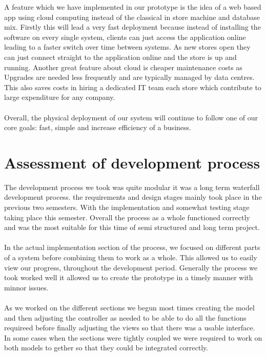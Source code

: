 \documentclass[a4paper]{article}
\begin{document}
A feature which we have implemented in our prototype is the idea of a web based app using cloud computing instead of the classical in store machine and database mix. Firstly this will lead a very fast deployment because instead of installing the software on every single system, clients can just access the application online leading to a faster switch over time between systems. As new stores open they can just connect straight to the application online and the store is up and running. Another great feature about cloud is cheaper maintenance costs as Upgrades are needed less frequently and are typically managed by data centres. This also saves costs in hiring a dedicated IT team each store which contribute to large expenditure for any company. 
\\\\
Overall, the physical deployment of our system will continue to follow one of our core goals: fast, simple and increase efficiency of a business. 
\pagebreak
\section{Assessment of development process}
The development process we took was quite modular it was a long term waterfall development process. the requirements and design stages mainly took place in the previous two semesters. With the implementation and somewhat testing stage taking place this  semester.  Overall the process as a whole functioned correctly and was the most suitable for this time of semi structured and long term project. 
\\\\
In the actual implementation section of the process, we focused on different parts of a system before combining them to work as a whole. This allowed us to easily view our progress, throughout the development period. Generally the process we took worked well it allowed us to create the prototype in a timely manner with minnor issues.
\\\\
As we worked on the different sections we begun most times creating the model  and then adjusting the controller as needed to be able to do all the functions requireed before finally adjusting the views so that there was a usable interface. In some cases when the sections were tightly coupled we were required to work on  both models to gether so that they could be integrated correctly. 
\pagebreak
\end{document}
